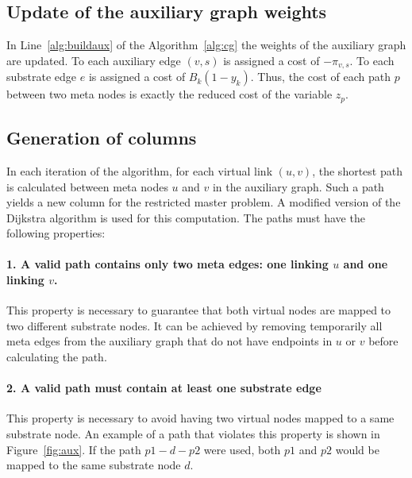 \documentclass[article]{llncs}
\begin{document}
\subsection{Update of the auxiliary graph weights}\label{sec:update}
In Line~\ref{alg:buildaux} of the Algorithm~\ref{alg:cg} the weights of the auxiliary graph are updated.
To each auxiliary edge $(v,s)$ is assigned a cost of $-\pi_{v,s}$. 
To each substrate edge $e$ is assigned a cost of $B_{k}(1 - y_{k})$. 
Thus, the cost of each path $p$ between two meta nodes is exactly the reduced cost of the variable $z_{p}$.


\subsection{Generation of columns}
In each iteration of the algorithm, for each virtual link $(u,v)$, the shortest path is calculated between meta nodes $u$ and $v$ in the auxiliary graph.
Such a path yields a new column for the restricted master problem. 
A modified version of the Dijkstra algorithm is used for this computation. 
The paths must have the following properties:

\paragraph{1. A valid path contains only two meta edges: one linking $u$ and one linking $v$.}
This property is necessary to guarantee that both virtual nodes are mapped to two different substrate nodes. 
It can be achieved by removing temporarily all meta edges from the auxiliary graph that do not have endpoints in $u$ or $v$ before calculating the path. 

\paragraph{2. A valid path must contain at least one substrate edge}
This property is necessary to avoid having two virtual nodes mapped to a same substrate node.
An example of a path that violates this property is shown in Figure~\ref{fig:aux}. 
If the path $p1-d-p2$ were used, both $p1$ and $p2$ would be mapped to the same substrate node $d$. 
\end{document}
